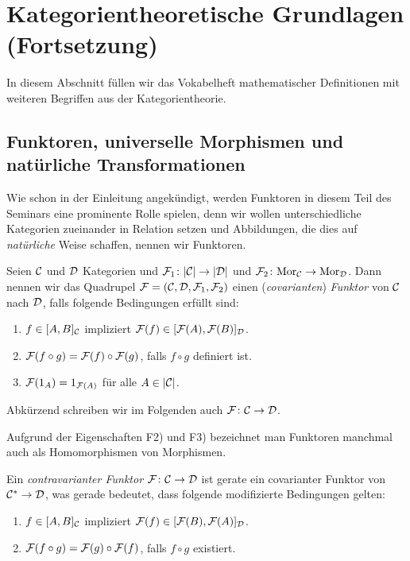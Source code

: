 \section{Kategorientheoretische Grundlagen (Fortsetzung)}

In diesem Abschnitt füllen wir das Vokabelheft mathematischer Definitionen mit weiteren Begriffen aus der Kategorientheorie.

\subsection{Funktoren, universelle Morphismen und natürliche Transformationen}

Wie schon in der Einleitung angekündigt, werden Funktoren in diesem Teil des Seminars eine prominente Rolle spielen, denn wir wollen unterschiedliche Kategorien zueinander in Relation setzen und Abbildungen, die dies auf \emph{natürliche} Weise schaffen, nennen wir Funktoren.

\begin{defn}
  Seien $\mathcal{C}$ und $\mathcal{D}$ Kategorien und $\mathcal{F}_1 \colon |\mathcal{C}| \to |\mathcal{D}|$ und $\mathcal{F}_2 \colon \mathrm{Mor}_{\mathcal{C}}\to \mathrm{Mor}_{\mathcal{D}}$. 
  Dann nennen wir das Quadrupel $\mathcal{F} = (\mathcal{C}, \mathcal{D}, \mathcal{F}_1, \mathcal{F}_2)$ einen (\emph{covarianten}) \emph{Funktor} von $\mathcal{C}$ nach $\mathcal{D}$, falls folgende Bedingungen erfüllt sind:
  \begin{enumerate}[F1)]
    \item $f \in [A, B]_{\mathcal{C}}$ impliziert $\mathcal{F}(f) \in [\mathcal{F}(A), \mathcal{F}(B)]_{\mathcal{D}}$.
    \item $\mathcal{F}(f \circ g) = \mathcal{F}(f) \circ \mathcal{F}(g)$, falls $f \circ g$ definiert ist.
    \item $\mathcal{F}(1_A) = 1_{\mathcal{F}(A)}$ für alle $A \in |\mathcal{C}|$.
  \end{enumerate}
  Abkürzend schreiben wir im Folgenden auch $\mathcal{F} \colon \mathcal{C} \to \mathcal{D}$.
\end{defn}

Aufgrund der Eigenschaften F2) und F3) bezeichnet man Funktoren manchmal auch als Homomorphismen von Morphismen.

Ein \emph{contravarianter Funktor} $\mathcal{F} \colon \mathcal{C} \to \mathcal{D}$ ist gerate ein covarianter Funktor von $\mathcal{C}^* \to \mathcal{D}$, was gerade bedeutet, dass folgende modifizierte Bedingungen gelten:
\begin{enumerate}[F1')]
  \item $f \in [A, B]_{\mathcal{C}}$ impliziert $\mathcal{F}(f) \in [\mathcal{F}(B), \mathcal{F}(A)]_{\mathcal{D}}$.
  \item $\mathcal{F}(f \circ g) = \mathcal{F}(g) \circ \mathcal{F}(f)$, falls $f \circ g$ existiert.
\end{enumerate}


